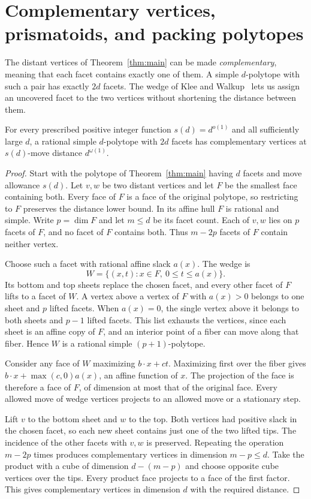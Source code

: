 \section{Complementary vertices, prismatoids, and packing polytopes}\label{sec:geometry}

The distant vertices of Theorem~\ref{thm:main} can be made
\emph{complementary}, meaning that each facet contains exactly one of them.
A simple $d$-polytope with such a pair has exactly $2d$ facets.
The wedge of Klee and Walkup~\cite{kw} lets us assign an uncovered facet
to the two vertices without shortening the distance between them.

\begin{corollary}\label{cor:spindle}
For every prescribed positive integer function $s(d)=d^{o(1)}$ and all
sufficiently large $d$, a rational simple $d$-polytope with $2d$ facets
has complementary vertices at $s(d)$-move distance $d^{\omega(1)}$.
\end{corollary}

\begin{proof}
Start with the polytope of Theorem~\ref{thm:main} having $d$ facets and
move allowance $s(d)$. Let $v,w$ be two distant vertices and let $F$ be
the smallest face containing both. Every face of $F$ is a face of the
original polytope, so restricting to $F$ preserves the distance lower
bound. In its affine hull $F$ is rational and simple. Write $p=\dim F$
and let $m\le d$ be its facet count. Each of $v,w$ lies on $p$ facets
of $F$, and no facet of $F$ contains both. Thus $m-2p$ facets of $F$
contain neither vertex.

Choose such a facet with rational affine slack $a(x)$. The wedge is
\[
               W=\{(x,t):x\in F,\ 0\le t\le a(x)\}.
\]
Its bottom and top sheets replace the chosen facet, and every other
facet of $F$ lifts to a facet of $W$. A vertex above a vertex of $F$
with $a(x)>0$ belongs to one sheet and $p$ lifted facets. When
$a(x)=0$, the single vertex above it belongs to both sheets and
$p-1$ lifted facets. This list exhausts the vertices, since each sheet is an
affine copy of $F$, and an interior point of a fiber can move along
that fiber. Hence $W$ is a rational simple $(p+1)$-polytope.

Consider any face of $W$ maximizing $b\cdot x+ct$. Maximizing first
over the fiber gives $b\cdot x+\max(c,0)a(x)$, an affine function of
$x$. The projection of the face is therefore a face of $F$, of
dimension at most that of the original face. Every allowed move of
wedge vertices projects to an allowed move or a stationary step.

Lift $v$ to the bottom sheet and $w$ to the top. Both vertices had
positive slack in the chosen facet, so each new sheet contains just one
of the two lifted tips. The incidence of the other facets with $v,w$ is
preserved. Repeating the operation $m-2p$ times produces complementary
vertices in dimension $m-p\le d$. Take the product with a cube of
dimension $d-(m-p)$ and choose opposite cube vertices over the tips.
Every product face projects to a face of the first factor. This gives
complementary vertices in dimension $d$ with the required distance.
\end{proof}

